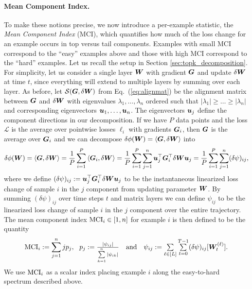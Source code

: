 \paragraph{Mean Component Index.} To make these notions precise, we now introduce a per-example statistic, the \textit{Mean Component Index} (MCI), which quantifies how much of the loss change for an example occurs in top versus tail components. 
Examples with small MCI correspond to the ``easy'' examples above and those with high MCI correspond to the ``hard'' examples. Let us recall the setup in Section \ref{sec:topk_decomposition}. For simplicity, let us consider a single layer ${\boldsymbol W}$ with gradient ${\boldsymbol G}$ and update $\delta {\boldsymbol W}$ at time $t$, since everything will extend to multiple layers by summing over each layer. As before, let $\mathcal{S}({\boldsymbol G}, \delta {\boldsymbol W})$ from Eq.\ (\ref{eq:alignmat}) be the alignment matrix between ${\boldsymbol G}$ and $\delta {\boldsymbol W}$ with eigenvalues $\lambda_1, \ldots, \lambda_n$ ordered such that $|\lambda_1| \geq \dots \geq |\lambda_n|$ and corresponding eigenvectors ${\boldsymbol u}_1, \ldots, {\boldsymbol u}_n$. The eigenvectors ${\boldsymbol u}_j$ define the component directions in our decomposition. 
If we have $P$ data points and the loss $\mathcal{L}$ is the average over pointwise losses $\ell_i$ with gradients ${\boldsymbol G}_i$, then ${\boldsymbol G}$ is the average over ${\boldsymbol G}_i$ and we can decompose $\delta \phi({\boldsymbol W}) = \left\langle {\boldsymbol G}, \delta {\boldsymbol W} \right\rangle$ into
\[
    \delta \phi({\boldsymbol W}) = \left\langle {\boldsymbol G}, \delta {\boldsymbol W} \right\rangle = \frac{1}{P} \sum\limits_{i=1}^P \left\langle {\boldsymbol G}_i, \delta {\boldsymbol W} \right\rangle = \frac{1}{P} \sum\limits_{i=1}^P \sum\limits_{j=1}^n {\boldsymbol u}_j^\top {\boldsymbol G}_i^\top \delta {\boldsymbol W} {\boldsymbol u}_j = \frac{1}{P} \sum\limits_{i=1}^P \sum\limits_{j=1}^n (\delta \psi)_{ij},
\]
where we define $(\delta \psi)_{ij} := {\boldsymbol u}_j^\top {\boldsymbol G}_i^\top \delta {\boldsymbol W} {\boldsymbol u}_j$ to be the instantaneous linearized loss change of sample $i$ in the $j$ component from updating parameter ${\boldsymbol W}$. By summing $(\delta \psi)_{ij}$ over time steps $t$ and matrix layers we can define $\psi_{ij}$ to be the linearized loss change of sample $i$ in the $j$ component over the entire trajectory. The mean component index $\mathrm{MCI}_i \in [1, n]$ for example $i$ is then defined to be the quantity
\begin{equation}\label{eq:mean_component_index}
    \mathrm{MCI}_i := \sum\limits_{j = 1}^n j p_j,~~p_j := \textstyle\frac{|\psi_{ij}|}{\sum\limits_{k=1}^n |\psi_{ik}|}~~\text{ and }~~\psi_{ij} := \sum\limits_{\ell \in [L]} \sum\limits_{t=0}^{T-1} (\delta \psi)_{ij}[{\boldsymbol W}_t^{(\ell)}].
\end{equation}
We use $\mathrm{MCI}_i$ as a scalar index placing example $i$ along the easy-to-hard spectrum described above. 

